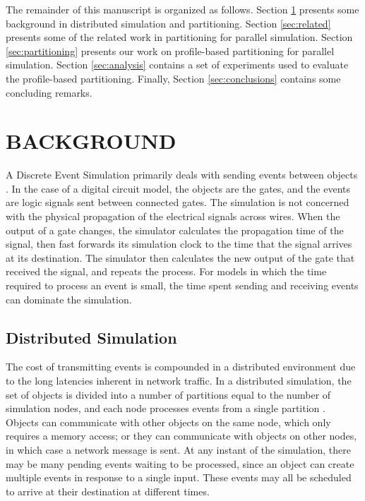 \documentclass{wscpaperproc}
\begin{document}
The remainder of this manuscript is organized as follows. Section \ref{sec:background} presents some background in distributed simulation and partitioning. Section \ref{sec:related} presents some of the related work in partitioning for parallel simulation. Section \ref{sec:partitioning} presents our work on profile-based partitioning for parallel simulation. Section \ref{sec:analysis} contains a set of experiments used to evaluate the profile-based partitioning. Finally, Section \ref{sec:conclusions} contains some concluding remarks.

\section{BACKGROUND}\label{sec:background}

A Discrete Event Simulation primarily deals with sending events between objects \cite{law-00,fujimoto-90}. In the case of a digital circuit model, the objects are the gates, and the events are logic signals sent between connected gates. The simulation is not concerned with the physical propagation of the electrical signals across wires. When the output of a gate changes, the simulator calculates the propagation time of the signal, then fast forwards its simulation clock to the time that the signal arrives at its destination. The simulator then calculates the new output of the gate that received the signal, and repeats the process. For models in which the time required to process an event is small, the time spent sending and receiving events can dominate the simulation.

\subsection{Distributed Simulation}

The cost of transmitting events is compounded in a distributed environment due to the long latencies inherent in network traffic. In a distributed simulation, the set of objects is divided into a number of partitions equal to the number of simulation nodes, and each node processes events from a single partition \cite{fujimoto-90}. Objects can communicate with other objects on the same node, which only requires a memory access; or they can communicate with objects on other nodes, in which case a network message is sent. At any instant of the simulation, there may be many pending events waiting to be processed, since an object can create multiple events in response to a single input. These events may all be scheduled to arrive at their destination at different times.
\end{document}
